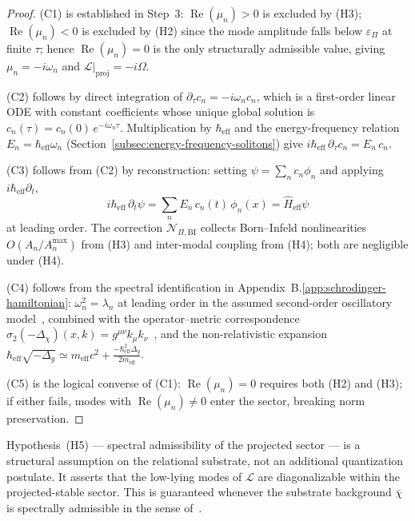     \begin{proof}
      (C1) is established in Step~3: $\operatorname{Re}(\mu_n) > 0$ is excluded by (H3);
      $\operatorname{Re}(\mu_n) < 0$ is excluded by (H2) since the mode amplitude falls below
      $\varepsilon_\Pi$ at finite $\tau$; hence $\operatorname{Re}(\mu_n) = 0$ is the only
      structurally admissible value, giving $\mu_n = -i\omega_n$ and
      $\mathcal{L}|_{\mathrm{proj}} = -i\Omega$.

      (C2) follows by direct integration of $\partial_\tau c_n = -i\omega_n c_n$, which is a
      first-order linear ODE with constant coefficients whose unique global solution is
      $c_n(\tau) = c_n(0)\,e^{-i\omega_n\tau}$.
      Multiplication by $\hbar_{\mathrm{eff}}$ and the energy-frequency relation
      $E_n = \hbar_{\mathrm{eff}}\omega_n$
      (Section~\ref{subsec:energy-frequency-solitons}) give
      $i\hbar_{\mathrm{eff}}\,\partial_\tau c_n = E_n\,c_n$.

      (C3) follows from (C2) by reconstruction: setting
      $\psi = \sum_n c_n\phi_n$ and applying $i\hbar_{\mathrm{eff}}\partial_t$,
      \[
        i\hbar_{\mathrm{eff}}\,\partial_t\psi
        = \sum_n E_n\,c_n(t)\,\phi_n(x) = \hat{H}_{\mathrm{eff}}\psi
      \]
      at leading order.
      The correction $\mathcal{N}_{\Pi,\mathrm{BI}}$ collects Born--Infeld nonlinearities
      $O(A_n/A_n^{\max})$ from (H3) and inter-modal coupling from (H4); both are
      negligible under (H4).

      (C4) follows from the spectral identification in
      Appendix~B.\ref{app:schrodinger-hamiltonian}:
      $\omega_n^2 = \lambda_n$ at leading order in the assumed second-order oscillatory
      model~\cite{Beau2026a1}, combined with the operator--metric correspondence
      $\sigma_2(-\Delta_\chi)(x,k) = g^{\mu\nu}k_\mu k_\nu$~\cite{Beau2026c}, and the
      non-relativistic expansion
      $\hbar_{\mathrm{eff}}\sqrt{-\Delta_g}
      \simeq m_{\mathrm{eff}}c^2 + \frac{-\hbar_{\mathrm{eff}}^2\Delta_g}{2m_{\mathrm{eff}}}$.

      (C5) is the logical converse of (C1): $\operatorname{Re}(\mu_n) = 0$ requires both
      (H2) and (H3); if either fails, modes with $\operatorname{Re}(\mu_n) \neq 0$ enter
      the sector, breaking norm preservation.
    \end{proof}

    \begin{remark}
      Hypothesis~(H5) --- spectral admissibility of the projected sector --- is a structural
      assumption on the relational substrate, not an additional quantization postulate.
      It asserts that the low-lying modes of $\mathcal{L}$ are diagonalizable within the
      projected-stable sector.
      This is guaranteed whenever the substrate background $\bar{\chi}$ is spectrally
      admissible in the sense of~\cite{Beau2026a1}.
    \end{remark}

